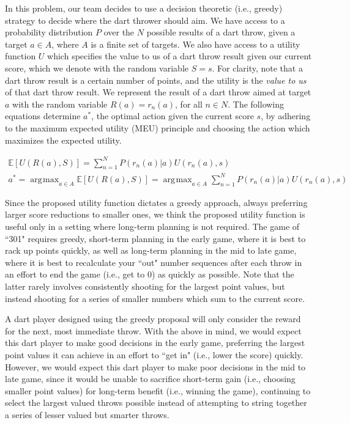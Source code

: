 \documentclass[solution, letterpaper]{cs121}
\DeclareMathOperator*{\argmax}{\arg\!\max}
\begin{document}


\subproblem{} %
In this problem, our team decides to use a decision theoretic (i.e., greedy) strategy to decide where the dart thrower should aim. We have access to a probability distribution $P$ over the $N$ possible results of a dart throw, given a target $a \in A$, where $A$ is a finite set of targets. We also have access to a utility function $U$ which specifies the value to us of a dart throw result given our current score, which we denote with the random variable $S = s$. For clarity, note that a dart throw result is a certain number of points, and the utility is the \emph{value to us} of that dart throw result. We represent the result of a dart throw aimed at target $a$ with the random variable $R(a) = r_n(a)$, for all $n \in N$. The following equations determine $a^*$, the optimal action given the current score $s$, by adhering to the maximum expected utility (MEU) principle and choosing the action which maximizes the expected utility.

\begin{eqnarray}
\mathbb{E}\left[U(R(a),S)\right] = \sum_{n=1}^N P(r_n(a) | a) U(r_n(a),s) \\
a^* = \argmax_{a \in A} \mathbb{E}\left[U(R(a),S)\right] = \argmax_{a \in A} \sum_{n=1}^N P(r_n(a) | a) U(r_n(a),s)
\end{eqnarray}

\subproblem{} %
Since the proposed utility function dictates a greedy approach, always preferring larger score reductions to smaller ones, we think the proposed utility function is useful only in a setting where long-term planning is not required. The game of ``301" requires greedy, short-term planning in the early game, where it is best to rack up points quickly, as well as long-term planning in the mid to late game, where it is best to recalculate your ``out" number sequences after each throw in an effort to end the game (i.e., get to 0) as quickly as possible. Note that the latter rarely involves consistently shooting for the largest point values, but instead shooting for a series of smaller numbers which sum to the current score.

A dart player designed using the greedy proposal will only consider the reward for the next, most immediate throw. With the above in mind, we would expect this dart player to make good decisions in the early game, preferring the largest point values it can achieve in an effort to ``get in" (i.e., lower the score) quickly. However, we would expect this dart player to make poor decisions in the mid to late game, since it would be unable to sacrifice short-term gain (i.e., choosing smaller point values) for long-term benefit (i.e., winning the game), continuing to select the largest valued throws possible instead of attempting to string together a series of lesser valued but smarter throws.
\end{document}
